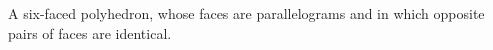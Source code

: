 A six-faced polyhedron, whose faces are parallelograms and
in which opposite pairs of faces are identical.